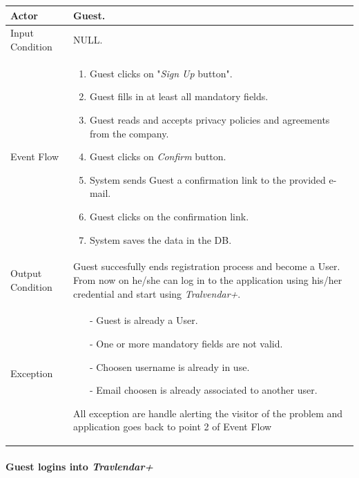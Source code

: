 		\begin{tabular}{| l | p{} | }
			\hline
			\hline
			Actor	&		Guest. \\
			\hline
			Input Condition		&		NULL. \\
			\hline
			Event Flow		&		\begin{enumerate}
												\item Guest clicks on "\textit{Sign Up} button".
												\item Guest fills in at least all mandatory fields.
												\item Guest reads and accepts privacy policies and agreements from the company.
												\item Guest clicks on \textit{Confirm} button.
												\item System sends Guest a confirmation link to the provided e-mail.
												\item Guest clicks on the confirmation link.
												\item	 System saves the data in the DB.
											\end{enumerate} \\
			\hline
			Output Condition		&		Guest succesfully ends registration process and become a User. From now on he/she can log in to the application using his/her credential and start using \textit{Tralvendar+}. \\
			\hline		
			Exception		&		\begin{itemize}
											\item[-] Guest is already a User.
											\item[-] One or more mandatory fields are not valid.
											\item[-] Choosen username is already in use.
											\item[-] Email choosen is already associated to another user.
										\end{itemize}
										All exception are handle alerting the visitor of the problem and application goes back to point 2 of Event Flow \\
			\hline
			\hline
		\end{tabular}

	\paragraph{Guest logins into \textit{Travlendar+}}
	
